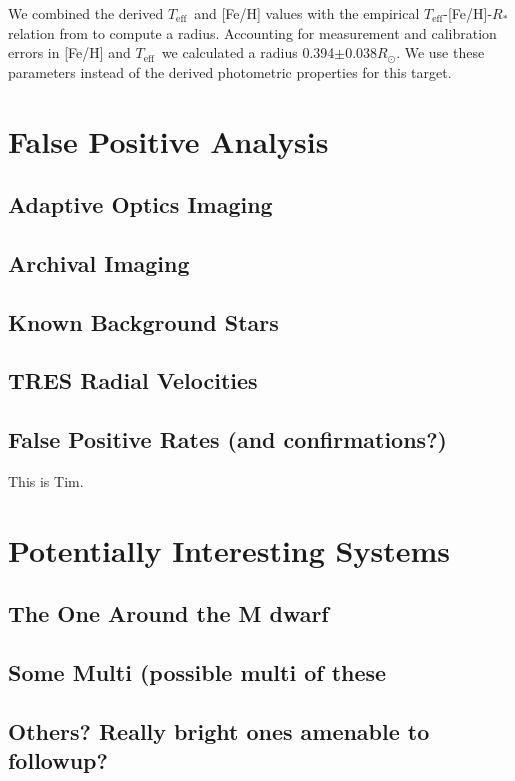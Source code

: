 \documentclass{emulateapj}
\newcommand\teff{\ensuremath{T_\text{eff}}}
\begin{document}
We combined the derived \teff\ and [Fe/H] values with the empirical 
\teff-[Fe/H]-$R_*$ relation from \citet{Mann2015} to compute a radius. 
Accounting for measurement and calibration errors in [Fe/H] and \teff\ we calculated 
a radius 0.394$\pm0.038R_\odot$. 
We use these parameters instead of the derived photometric properties for this target.

\section{False Positive Analysis}
\subsection{Adaptive Optics Imaging}

\subsection{Archival Imaging}

\subsection{Known Background Stars}

\subsection{TRES Radial Velocities}

\subsection{False Positive Rates (and confirmations?)}
This is Tim.

\section{Potentially Interesting Systems}
\subsection{The One Around the M dwarf}



\subsection{Some Multi (possible multi of these}

\subsection{Others? Really bright ones amenable to followup?}
\end{document}
